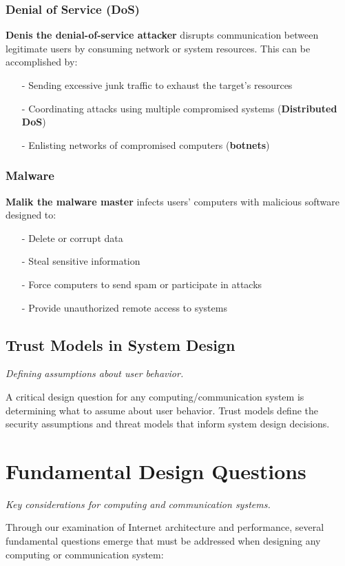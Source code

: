 \documentclass[../../compsys.tex]{subfiles}
\begin{document}
\subsubsection{Denial of Service (DoS)}
\textbf{Denis the denial-of-service attacker} disrupts communication between legitimate users by consuming network or system resources. This can be accomplished by:
\begin{itemize}
  \item[-] Sending excessive junk traffic to exhaust the target's resources
  \item[-] Coordinating attacks using multiple compromised systems (\textbf{Distributed DoS})
  \item[-] Enlisting networks of compromised computers (\textbf{botnets})
\end{itemize}

\subsubsection{Malware}
\textbf{Malik the malware master} infects users' computers with malicious software designed to:
\begin{itemize}
  \item[-] Delete or corrupt data
  \item[-] Steal sensitive information
  \item[-] Force computers to send spam or participate in attacks
  \item[-] Provide unauthorized remote access to systems
\end{itemize}

\subsection{Trust Models in System Design}
\textit{Defining assumptions about user behavior.}

A critical design question for any computing/communication system is determining what to assume about user behavior. Trust models define the security assumptions and threat models that inform system design decisions.

\section{Fundamental Design Questions}
\textit{Key considerations for computing and communication systems.}

Through our examination of Internet architecture and performance, several fundamental questions emerge that must be addressed when designing any computing or communication system:
\end{document}

